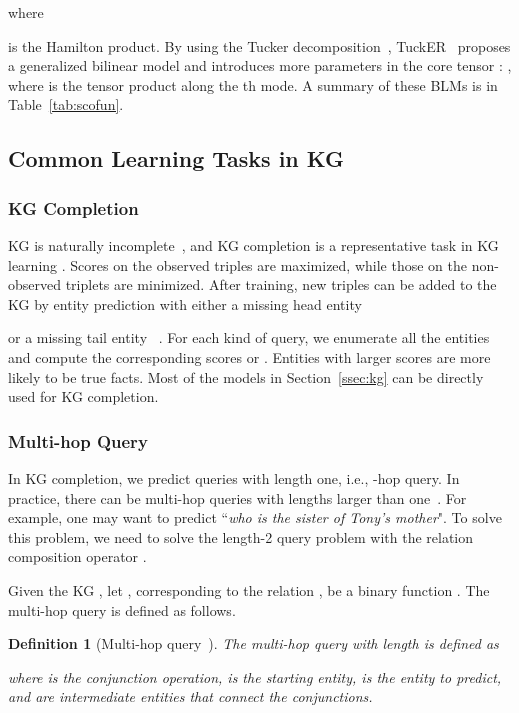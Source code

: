 \documentclass[10pt,journal,compsoc]{IEEEtran}
\newtheorem{definition}{Definition}
\begin{document}
where
 
is the Hamilton product.
By using the Tucker decomposition~\cite{tucker1966some},
TuckER~\cite{balavzevic2019tucker} proposes a generalized bilinear model 
and introduces more parameters in the core tensor :
,
where
 is the tensor product along the th mode.
A summary of 
these BLMs is  
in
Table~\ref{tab:scofun}.




\subsection{Common Learning Tasks in KG}


\subsubsection{KG Completion}
\label{sec:app1}

KG
is naturally incomplete~\cite{singhal2012introducing}, and
KG completion is a representative task in KG learning \cite{wang2017knowledge,nickel2011three,bordes2013translating,kazemi2018simple,trouillon2017knowledge,yang2014embedding,dettmers2017convolutional}.  
Scores on the observed triples are maximized, while those on the non-observed  triplets are minimized.
After training,
new triples 
can be added
to the KG
by entity prediction with either a missing head
entity

or a missing tail entity
~\cite{wang2017knowledge}.
For each kind of query,
we enumerate all the entities 
and compute the corresponding scores  or
.
Entities with larger scores are more likely to be true facts.
Most of the models in Section~\ref{ssec:kg} can be directly used for KG completion.


\subsubsection{Multi-hop Query}
\label{sec:app2}

In KG completion, we predict queries  with length one, i.e., -hop query.  In practice, there can be multi-hop queries with lengths larger than one~\cite{guu2015traversing,hamilton2018embedding,wang2017knowledge}.  For example, one may want to predict ``\textit{who is the sister of Tony's mother}".  
To solve this problem, we need to solve the length-2 query problem  with the relation composition operator .

Given the KG ,
let 
,
corresponding to the relation ,
be a binary function
.
The multi-hop query 
is defined
as follows.
\begin{definition}[Multi-hop query~\cite{hamilton2018embedding,ren2019query2box}]
	The multi-hop query  with length 
	is defined as
	
	where  is the conjunction operation,  is the starting entity,  is the entity to predict,
	and  are intermediate entities that connect the conjunctions.
\end{definition}
\end{document}
